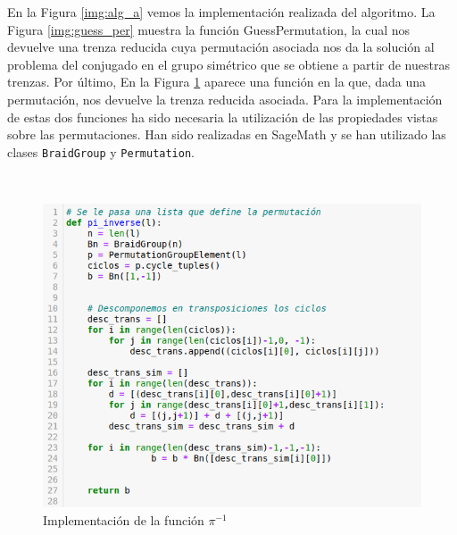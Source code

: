\documentclass[12pt]{book}
\theoremstyle{definition}
\begin{document}
En la Figura \ref{img:alg_a} vemos la implementación realizada del algoritmo. La Figura \ref{img:guess_per} muestra la función GuessPermutation, la cual nos devuelve una trenza reducida cuya permutación asociada nos da la solución al problema del conjugado en el grupo simétrico que se obtiene a partir de nuestras trenzas. Por último, En la Figura \ref{img:pi_inverse} aparece una función en la que, dada una permutación, nos devuelve la trenza reducida asociada. Para la implementación de estas dos funciones ha sido necesaria la utilización de las propiedades vistas sobre las permutaciones. Han sido realizadas en SageMath y se han utilizado las clases \texttt{BraidGroup} y \texttt{Permutation}.

\ 
\newline
\newline
\begin{figure}[h!]
\centering
\includegraphics[scale=0.5]{imgs/pi_inverse.png} 
\caption{Implementación de la función $\pi^{-1}$}
\label{img:pi_inverse}
\end{figure}
\ 
\newline
\newline
\end{document}
